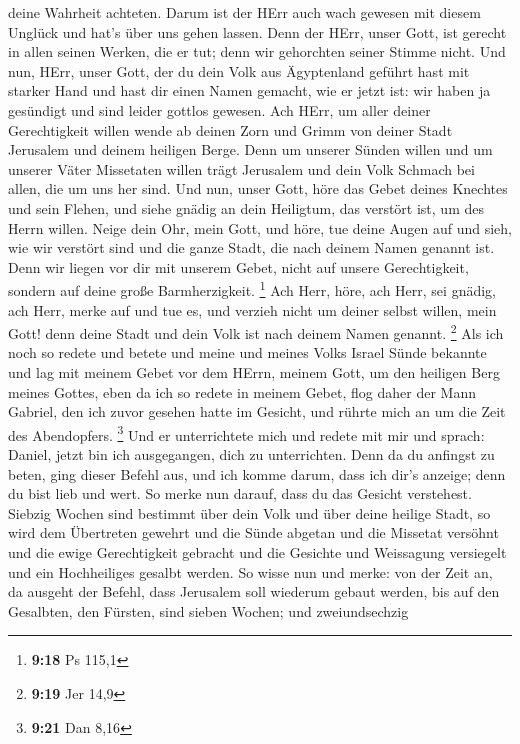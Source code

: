deine Wahrheit achteten.  Darum ist der HErr auch wach
gewesen mit diesem Unglück und hat's über uns gehen lassen. Denn der
HErr, unser Gott, ist gerecht in allen seinen Werken, die er tut; denn
wir gehorchten seiner Stimme nicht.  Und nun, HErr, unser
Gott, der du dein Volk aus Ägyptenland geführt hast mit starker Hand und
hast dir einen Namen gemacht, wie er jetzt ist: wir haben ja gesündigt
und sind leider gottlos gewesen.  Ach HErr, um aller
deiner Gerechtigkeit willen wende ab deinen Zorn und Grimm von deiner
Stadt Jerusalem und deinem heiligen Berge. Denn um unserer Sünden willen
und um unserer Väter Missetaten willen trägt Jerusalem und dein Volk
Schmach bei allen, die um uns her sind.  Und nun, unser
Gott, höre das Gebet deines Knechtes und sein Flehen, und siehe gnädig
an dein Heiligtum, das verstört ist, um des Herrn willen.
 Neige dein Ohr, mein Gott, und höre, tue deine Augen auf
und sieh, wie wir verstört sind und die ganze Stadt, die nach deinem
Namen genannt ist. Denn wir liegen vor dir mit unserem Gebet, nicht auf
unsere Gerechtigkeit, sondern auf deine große Barmherzigkeit.
\footnote{\textbf{9:18} Ps 115,1}  Ach Herr, höre, ach
Herr, sei gnädig, ach Herr, merke auf und tue es, und verzieh nicht um
deiner selbst willen, mein Gott! denn deine Stadt und dein Volk ist nach
deinem Namen genannt. \footnote{\textbf{9:19} Jer 14,9} 
Als ich noch so redete und betete und meine und meines Volks Israel
Sünde bekannte und lag mit meinem Gebet vor dem HErrn, meinem Gott, um
den heiligen Berg meines Gottes,  eben da ich so redete
in meinem Gebet, flog daher der Mann Gabriel, den ich zuvor gesehen
hatte im Gesicht, und rührte mich an um die Zeit des Abendopfers.
\footnote{\textbf{9:21} Dan 8,16}  Und er unterrichtete
mich und redete mit mir und sprach: Daniel, jetzt bin ich ausgegangen,
dich zu unterrichten.  Denn da du anfingst zu beten, ging
dieser Befehl aus, und ich komme darum, dass ich dir's anzeige; denn du
bist lieb und wert. So merke nun darauf, dass du das Gesicht verstehest.
 Siebzig Wochen sind bestimmt über dein Volk und über
deine heilige Stadt, so wird dem Übertreten gewehrt und die Sünde
abgetan und die Missetat versöhnt und die ewige Gerechtigkeit gebracht
und die Gesichte und Weissagung versiegelt und ein Hochheiliges gesalbt
werden.  So wisse nun und merke: von der Zeit an, da
ausgeht der Befehl, dass Jerusalem soll wiederum gebaut werden, bis auf
den Gesalbten, den Fürsten, sind sieben Wochen; und zweiundsechzig
